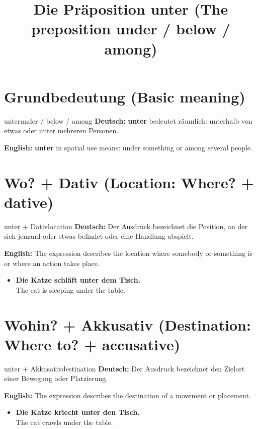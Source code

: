 \documentclass[a4paper,11pt]{article}
\title{Die Präposition unter (The preposition under / below / among)}
\date{}
\newcommand{\GermanText}[1]{\textbf{Deutsch: }#1\par}
\newcommand{\EnglishText}[1]{{\small\color{SoftGray}\textbf{English: }#1\par}}
\newcommand{\ExampleItem}[2]{\item \textbf{#1}\\{\small\color{SoftGray}#2}}
\begin{document}
\maketitle
\tableofcontents
\newpage
\section{Grundbedeutung (Basic meaning)}
\begin{grammarentry}{unter}{under / below / among}
\GermanText{\textbf{unter} bedeutet räumlich: unterhalb von etwas oder unter mehreren Personen.}
\EnglishText{\textbf{unter} in spatial use means: under something or among several people.}
\end{grammarentry}
\section{Wo? + Dativ (Location: Where? + dative)}
\begin{grammarentry}{unter + Dativ}{location}
\GermanText{Der Ausdruck bezeichnet die Position, an der sich jemand oder etwas befindet oder eine Handlung abspielt.}
\EnglishText{The expression describes the location where somebody or something is or where an action takes place.}
\end{grammarentry}
\begin{exbox}
\begin{itemize}
\ExampleItem{Die Katze schläft unter dem Tisch.}{The cat is sleeping under the table.}
\end{itemize}
\end{exbox}
\section{Wohin? + Akkusativ (Destination: Where to? + accusative)}
\begin{grammarentry}{unter + Akkusativ}{destination}
\GermanText{Der Ausdruck bezeichnet den Zielort einer Bewegung oder Platzierung.}
\EnglishText{The expression describes the destination of a movement or placement.}
\end{grammarentry}
\begin{exbox}
\begin{itemize}
\ExampleItem{Die Katze kriecht unter den Tisch.}{The cat crawls under the table.}
\end{itemize}
\end{exbox}
\end{document}
